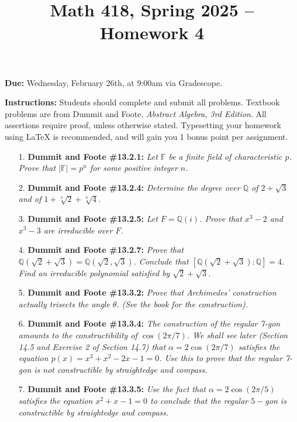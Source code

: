 \documentclass[12pt]{article}
\title{Math 418, Spring 2025 -- Homework 4}
\date{}
\newcommand{\Q}{\mathbb{Q}}
\newcommand{\F}{\mathbb{F}}
\begin{document}
 \maketitle
\vspace{-80pt}

\textbf{Due:} Wednesday, February 26th, at 9:00am via Gradescope.

\textbf{Instructions:} Students should complete and submit all problems. Textbook problems are from Dummit and Foote, \emph{Abstract Algebra, 3rd Edition}. All assertions require proof, unless otherwise stated. Typesetting your homework using LaTeX is recommended, and will gain you 1 bonus point per assignment.

\begin{enumerate}

\item[1.] \textbf{Dummit and Foote \#13.2.1:} \textit{Let $\F$ be a finite field of characteristic $p$. Prove that $|\F| = p^n$ for some positive integer $n$.}

\item[2.] \textbf{Dummit and Foote \#13.2.4:} \textit{Determine the degree over $\Q$ of $2 + \sqrt{3}$ and of $1 + \sqrt[3]{2} + \sqrt[3]{4}$.}

\item[3.] \textbf{Dummit and Foote \#13.2.5:} \textit{Let $F = \Q(i)$. Prove that $x^3 - 2$ and $x^3 - 3$ are irreducible over $F$.}

\item[4.] \textbf{Dummit and Foote \#13.2.7:} \textit{Prove that $\Q(\sqrt{2} + \sqrt{3}) = \Q(\sqrt{2}, \sqrt{3})$. Conclude that $[\Q(\sqrt{2} + \sqrt{3}) : \Q] = 4$. Find an irreducible polynomial satisfied by $\sqrt{2} + \sqrt{3}$.}

\item[5.] \textbf{Dummit and Foote \#13.3.2:} \textit{Prove that Archimedes' construction actually trisects the angle $\theta$. (See the book for the construction).}

\item[6.] \textbf{Dummit and Foote \#13.3.4:} \textit{The construction of the regular 7-gon amounts to the constructibility of $\cos(2\pi/7)$. We shall see later (Section 14.5 and Exercise 2 of Section 14.7) that $\alpha = 2 \cos(2\pi/7)$ satisfies the equation $p(x) = x^3 + x^2 - 2x - 1 = 0$. Use this to prove that the regular 7-gon is not constructible by straightedge and compass.}

\item[7.] \textbf{Dummit and Foote \#13.3.5:} \textit{Use the fact that $\alpha = 2\cos(2\pi/5)$ satisfies the equation $x^2 + x - 1 = 0$ to conclude that the regular $5-$gon is constructible by straightedge and compass.}

\end{enumerate}
\end{document}
